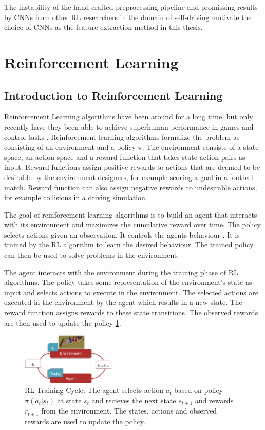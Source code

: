 The instability of the hand-crafted preprocessing pipeline and promissing results by CNNs from other RL researchers in the domain of self-driving \textcite{neptune} motivate the choice of CNNs as the feature extraction method in this thesis. 


\section{Reinforcement Learning}

\subsection{Introduction to Reinforcement Learning}

Reinforcement Learning algorithms have been around for a long time, but only recently have they been able to achieve superhuman performance in games and control tasks \textcite{atari}. Reinforcement learning algorithms formalize the problem as consisting of an environment and a policy $\pi$. The environment consists of a state space, an action space and a reward function that takes state-action pairs as input. Reward functions assign positive rewards to actions that are deemed to be desirable by the environment designers, for example scoring a goal in a football match. Reward function can also assign negative rewards to undesirable actions, for example collisions in a driving simulation. 

The goal of reinforcement learning algorithms is to build an agent that interacts with its environment and maximizes the cumulative reward over time. The policy selects actions given an observation. It controls the agents behaviour \textcite{rlbook2020}. It is trained by the \acs{RL} algorithm to learn the desired behaviour. The trained policy can then be used to solve problems in the environment. 

The agent interacts with the environment during the training phase of RL algorithms. The policy takes some representation of the environment's state as input and selects actions to execute in the environment. The selected actions are executed in the environment by the agent which results in a new state. The reward function assigns rewards to these state transitions.
The observed rewards are then used to update the policy \ref{fig:rlcycle}.

\begin{figure}
    \centering
    \includegraphics[width=0.4\textwidth]{Bilder/rl_cycle.png}
    \caption{RL Training Cycle: The agent selects action $a_t$ based on policy $\pi(a_t|s_t)$ at state $s_t$ and recieves the next state $s_{t+1}$ and rewards $r_{t+1}$ from the environment. The states, actions and observed rewards are used to update the policy.}
    \label{fig:rlcycle}
\end{figure}

